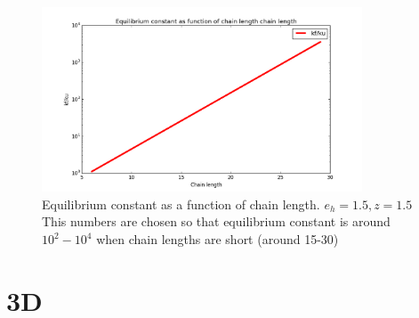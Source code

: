 \documentclass[12pt]{paper}
\begin{document}
\begin{figure}[h!]
  \centering
  \includegraphics[width=0.85\textwidth]{pictures/K.png} 
  \caption{Equilibrium constant as a function of chain length. $e_h=1.5,z=1.5$ This numbers are 
chosen so that equilibrium constant is around 
$10^2-10^4$ when chain lengths are short (around 15-30)}
  \label{fig:k_unf_N}
\end{figure}

\section{3D}
\end{document}
